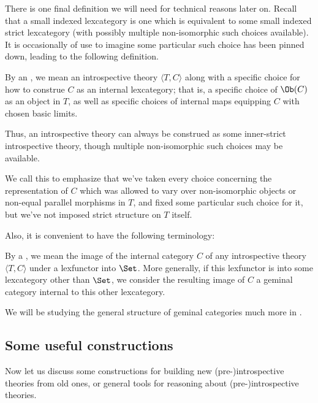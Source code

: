 There is one final definition we will need for technical reasons later on. Recall that a small indexed lexcategory is one which is equivalent to some small indexed strict lexcategory (with possibly multiple non-isomorphic such choices available). It is occasionally of use to imagine some particular such choice has been pinned down, leading to the following definition.

\begin{definition}
By an , we mean an introspective theory $\langle T, C\rangle$ along with a specific choice for how to construe $C$ as an internal lexcategory; that is, a specific choice of $\Ob(C)$ as an object in $T$, as well as specific choices of internal maps equipping $C$ with chosen basic limits.
\end{definition}

Thus, an introspective theory can always be construed as some inner-strict introspective theory, though multiple non-isomorphic such choices may be available. 

We call this  to emphasize that we've taken every choice concerning the representation of $C$ which was allowed to vary over non-isomorphic objects or non-equal parallel morphisms in $T$, and fixed some particular such choice for it, but we've not imposed strict structure on $T$ itself.

Also, it is convenient to have the following terminology:
\begin{definition}
By a , we mean the image of the internal category $C$ of any introspective theory $\langle T, C \rangle$ under a lexfunctor into $\Set$. More generally, if this lexfunctor is into some lexcategory other than $\Set$, we consider the resulting image of $C$ a geminal category internal to this other lexcategory.
\end{definition}
We will be studying the general structure of geminal categories much more in .

\subsection{Some useful constructions}
Now let us discuss some constructions for building new (pre-)introspective theories from old ones, or general tools for reasoning about (pre-)introspective theories.


